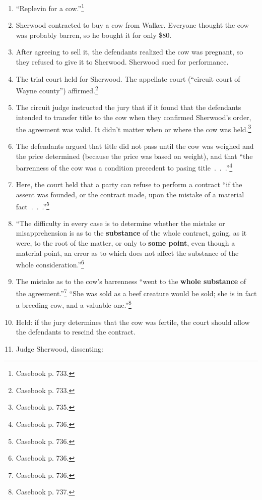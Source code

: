 \begin{enumerate}
    \item ``Replevin for a cow.''\footnote{Casebook p. 733.}
    \item Sherwood contracted to buy a cow from Walker. Everyone thought the 
    cow was probably barren, so he bought it for only \$80.
    \item After agreeing to sell it, the defendants realized the cow was 
    pregnant, so they refused to give it to Sherwood. Sherwood sued for 
    performance.
    \item The trial court held for Sherwood. The appellate court (``circuit 
    court of Wayne county'') affirmed.\footnote{Casebook p. 733.}
    \item The circuit judge instructed the jury that if it found that the 
    defendants intended to transfer title to the cow when they confirmed 
    Sherwood's order, the agreement was valid. It didn't matter when or where 
    the cow was held.\footnote{Casebook p. 735.}
    \item The defendants argued that title did not pass until the cow was 
    weighed and the price determined (because the price was based on weight), 
    and that ``the barrenness of the cow was a condition precedent to pasing 
    title~.~.~.''\footnote{Casebook p. 736.}
    \item Here, the court held that a party can refuse to perform a contract 
    ``if the assent was founded, or the contract made, upon the mistake of a 
    material fact~.~.~.''\footnote{Casebook p. 736.}
    \item ``The difficulty in every case is to determine whether the mistake 
    or misapprehension is as to the \textbf{substance} of the whole contract, 
    going, as it were, to the root of the matter, or only to \textbf{some 
    point}, even though a material point, an error as to which does not affect 
    the substance of the whole consideration.''\footnote{Casebook p. 736.}
    \item The mistake as to the cow's barrenness ``went to the \textbf{whole 
    substance} of the agreement.''\footnote{Casebook p. 736.} ``She was sold 
    as a beef creature would be sold; she is in fact a breeding cow, and a 
    valuable one.''\footnote{Casebook p. 737.}
    \item Held: if the jury determines that the cow was fertile, the court 
    should allow the defendants to rescind the contract.
    \item Judge Sherwood, dissenting:

\end{enumerate}
